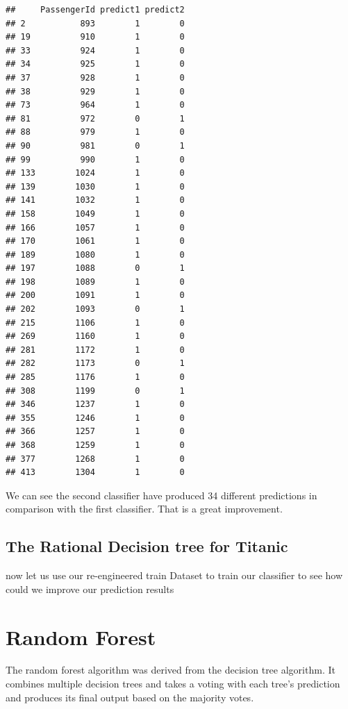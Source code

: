 \documentclass[
]{book}
\begin{document}
\begin{verbatim}
##     PassengerId predict1 predict2
## 2           893        1        0
## 19          910        1        0
## 33          924        1        0
## 34          925        1        0
## 37          928        1        0
## 38          929        1        0
## 73          964        1        0
## 81          972        0        1
## 88          979        1        0
## 90          981        0        1
## 99          990        1        0
## 133        1024        1        0
## 139        1030        1        0
## 141        1032        1        0
## 158        1049        1        0
## 166        1057        1        0
## 170        1061        1        0
## 189        1080        1        0
## 197        1088        0        1
## 198        1089        1        0
## 200        1091        1        0
## 202        1093        0        1
## 215        1106        1        0
## 269        1160        1        0
## 281        1172        1        0
## 282        1173        0        1
## 285        1176        1        0
## 308        1199        0        1
## 346        1237        1        0
## 355        1246        1        0
## 366        1257        1        0
## 368        1259        1        0
## 377        1268        1        0
## 413        1304        1        0
\end{verbatim}

We can see the second classifier have produced 34 different predictions in comparison with the first classifier. That is a great improvement.

\hypertarget{the-rational-decision-tree-for-titanic}{%
\subsection{The Rational Decision tree for Titanic}\label{the-rational-decision-tree-for-titanic}}

now let us use our re-engineered train Dataset to train our classifier to see how could we improve our prediction results

\hypertarget{random-forest}{%
\section{Random Forest}\label{random-forest}}

The random forest algorithm was derived from the decision tree algorithm. It combines multiple decision trees and takes a voting with each tree's prediction and produces its final output based on the majority votes.
\end{document}
